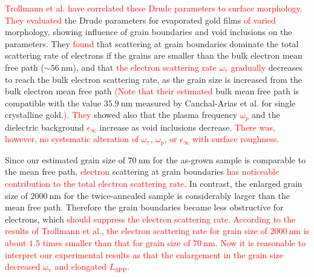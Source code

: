\documentclass[aip,apl,reprint]{revtex4-1}
\begin{document}
\color{black}
\textcolor{red}{Trollmann et al.\cite{Trollmann} have correlated these Drude parameters to surface morphology. They evaluated} the Drude parameters for evaporated gold films \textcolor{red}{of varied} morphology, showing influence of grain boundaries and void inclusions on the parameters. They \textcolor{red}{found} that scattering at grain boundaries dominate the total scattering rate of electrons if the grains are smaller than the bulk electron mean free path ($\sim 56\:\mathrm{nm}$), and that \textcolor{red}{the electron scattering rate $\omega_{\mathrm{\tau}}$ gradually} decreases to reach the bulk electron scattering rate, as the grain size is increased from the bulk electron mean free path \textcolor{red}{(Note that their estimated} bulk mean free path is compatible with the value $35.9 \:\mathrm{nm}$ measured by Canchal-Arias et al.\cite{Canchal-Arias} for single crystalline gold.\textcolor{red}{).} 
\textcolor{red}{They} showed also that the plasma frequency \textcolor{red}{$\omega_p$} and the dielectric background \textcolor{red}{$\epsilon_{\infty}$} increase as void inclusions decrease. \textcolor{red}{There was, however, no systematic alteration of $\omega_{\mathrm{\tau}}$, $\omega_p$, or $\epsilon_{\infty}$ with surface roughness.}

Since our estimated grain size of $70\:\mathrm{nm}$ for the as-grown sample is comparable to the mean free path, \textcolor{red}{electron} scattering at grain boundaries \textcolor{red}{has noticeable contribution to the total electron scattering rate}. In contrast, the enlarged grain size of $2000\:\mathrm{nm}$ for the twice-annealed sample is considerably larger than the mean free path. Therefore the grain boundaries became less obstructive for electrons, which \textcolor{red}{should suppress the electron scattering rate. According to the results of Trollmann et al.,\cite{Trollmann} the electron scattering rate for grain size of $2000\:\mathrm{nm}$ is about $1.5$ times smaller than that for grain size of $70\:\mathrm{nm}$. Now it is reasonable to interpret our experimental results as that the enlargement in the grain size decreased $\omega_{\mathrm{\tau}}$ and elongated $L_{\mathrm{SPP}}$.}
\end{document}
